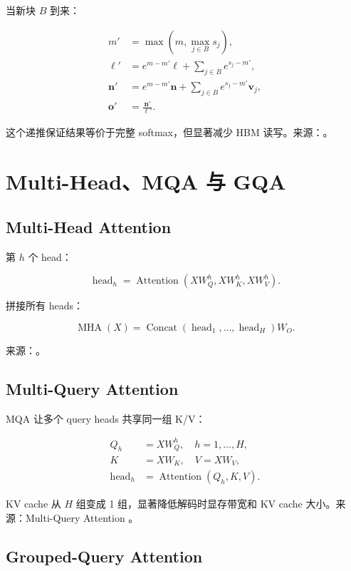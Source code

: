 \documentclass[UTF8,12pt]{ctexart}
\newcommand{\1}{\mathbf{1}}
\newcommand{\Attn}{\operatorname{Attention}}
\newcommand{\MHA}{\operatorname{MHA}}
\begin{document}
当新块 $B$ 到来：

\begin{align}
m' &= \max(m,\max_{j\in B}s_j),\\
\ell' &= e^{m-m'}\ell+\sum_{j\in B}e^{s_j-m'},\\
\bm{n}' &= e^{m-m'}\bm{n}+\sum_{j\in B}e^{s_j-m'}\bm{v}_j,\\
\bm{o}' &= \frac{\bm{n}'}{\ell'}.
\end{align}

这个递推保证结果等价于完整 softmax，但显著减少 HBM 读写。来源：\cite{dao2022flashattention}。

\section{Multi-Head、MQA 与 GQA}

\subsection{Multi-Head Attention}

第 $h$ 个 head：

\begin{equation}
\operatorname{head}_h
=\Attn(XW_Q^h,XW_K^h,XW_V^h).
\end{equation}

拼接所有 heads：

\begin{equation}
\MHA(X)
=\operatorname{Concat}(\operatorname{head}_1,\dots,\operatorname{head}_H)W_O.
\label{eq:mha}
\end{equation}

来源：\cite{vaswani2017attention}。

\subsection{Multi-Query Attention}

MQA 让多个 query heads 共享同一组 K/V：

\begin{align}
Q_h &= XW_Q^h,\quad h=1,\dots,H,\\
K &= XW_K,\quad V=XW_V,\\
\operatorname{head}_h &= \Attn(Q_h,K,V).
\end{align}

KV cache 从 $H$ 组变成 1 组，显著降低解码时显存带宽和 KV cache 大小。来源：Multi-Query Attention \cite{shazeer2019mqa}。

\subsection{Grouped-Query Attention}
\end{document}
